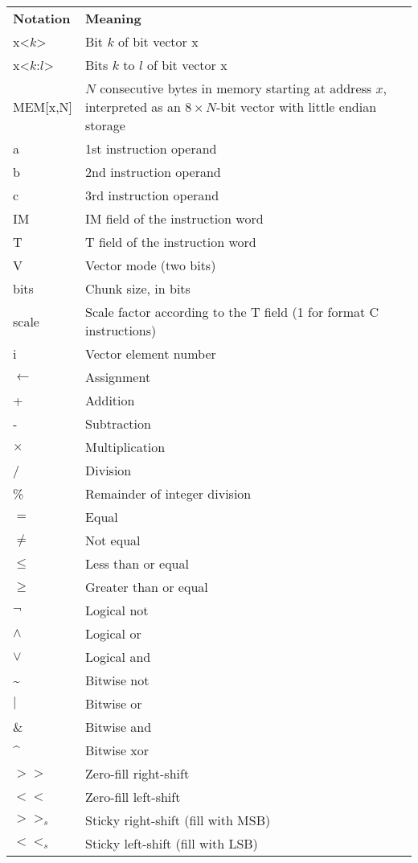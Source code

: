 \begin{tabular}{lp{170pt}}
\textbf{Notation} & \textbf{Meaning} \\
x<$k$> & Bit $k$ of bit vector x \\
x<$k$:$l$> & Bits $k$ to $l$ of bit vector x \\
MEM[x,N] & $N$ consecutive bytes in memory starting at address $x$, interpreted as an $8\times N$-bit vector with little endian storage \\
a & 1st instruction operand \\
b & 2nd instruction operand \\
c & 3rd instruction operand \\
IM & IM field of the instruction word \\
T & T field of the instruction word \\
V & Vector mode (two bits) \\
bits & Chunk size, in bits \\
scale & Scale factor according to the T field (1 for format C instructions) \\
i & Vector element number \\
$\leftarrow$ & Assignment \\
+ & Addition \\
- & Subtraction \\
$\times$ & Multiplication \\
/ & Division \\
\% & Remainder of integer division \\
$=$ & Equal \\
$\neq$ & Not equal \\
$\leq$ & Less than or equal \\
$\geq$ & Greater than or equal \\
$\neg$ & Logical not \\
$\wedge$ & Logical or \\
$\vee$ & Logical and \\
\textasciitilde & Bitwise not \\
$|$ & Bitwise or \\
\& & Bitwise and \\
\textasciicircum & Bitwise xor \\
$>>$ & Zero-fill right-shift \\
$<<$ & Zero-fill left-shift \\
$>>_{s}$ & Sticky right-shift (fill with MSB) \\
$<<_{s}$ & Sticky left-shift (fill with LSB) \\

\end{tabular}
